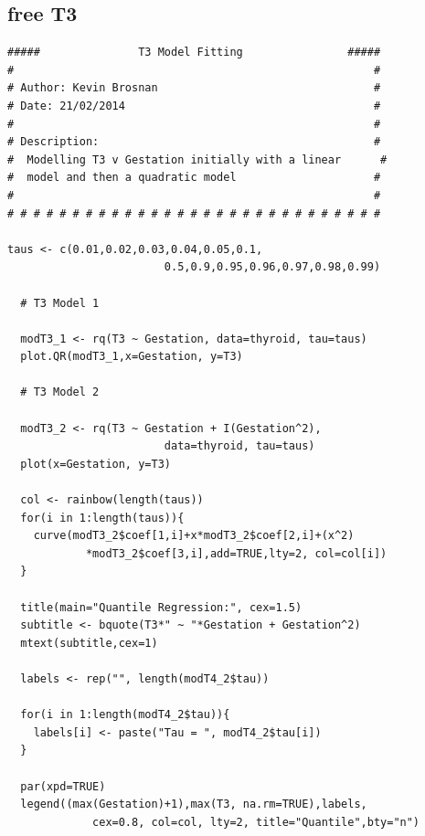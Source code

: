 \documentclass[12pt,a4paper]{report}
\begin{document}
\subsection*{free T3}\label{App:QuantileModelsT3}
\begin{lstlisting}
#####               T3 Model Fitting                #####
#                                                       #
# Author: Kevin Brosnan                                 #
# Date: 21/02/2014                                      #
#                                                       #
# Description:                                          #
#  Modelling T3 v Gestation initially with a linear      #
#  model and then a quadratic model                     #
#                                                       #
# # # # # # # # # # # # # # # # # # # # # # # # # # # # #

taus <- c(0.01,0.02,0.03,0.04,0.05,0.1,
                        0.5,0.9,0.95,0.96,0.97,0.98,0.99)

  # T3 Model 1

  modT3_1 <- rq(T3 ~ Gestation, data=thyroid, tau=taus)
  plot.QR(modT3_1,x=Gestation, y=T3)

  # T3 Model 2

  modT3_2 <- rq(T3 ~ Gestation + I(Gestation^2),
                        data=thyroid, tau=taus)
  plot(x=Gestation, y=T3)

  col <- rainbow(length(taus))
  for(i in 1:length(taus)){
    curve(modT3_2$coef[1,i]+x*modT3_2$coef[2,i]+(x^2)
            *modT3_2$coef[3,i],add=TRUE,lty=2, col=col[i])
  }

  title(main="Quantile Regression:", cex=1.5)
  subtitle <- bquote(T3*" ~ "*Gestation + Gestation^2)
  mtext(subtitle,cex=1)

  labels <- rep("", length(modT4_2$tau))

  for(i in 1:length(modT4_2$tau)){
    labels[i] <- paste("Tau = ", modT4_2$tau[i])
  }

  par(xpd=TRUE)
  legend((max(Gestation)+1),max(T3, na.rm=TRUE),labels,
             cex=0.8, col=col, lty=2, title="Quantile",bty="n")
\end{lstlisting}
\end{document}
